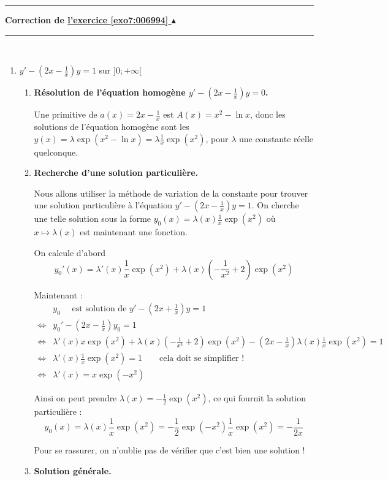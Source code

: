 \documentclass[11pt,a4paper]{article}
\newcounter{exo}
\newcommand{\correction}[1]{\hypertarget{cor7:#1}{}\label{cor7:#1}{\bf Correction de \hyperlink{exo7:#1}{l'exercice \ref{exo7:#1} $\blacktriangle$}}\vspace{1mm}\hrule\vspace{1mm}}
\newcommand{\fincorrection}{\vspace{1mm}\hrule\vspace*{7mm}}
\begin{document}
\fincorrection
\correction{006994}\ 
\begin{enumerate}
  \item $y' - (2x - \frac{1}{x})y = 1$ sur $]0;+\infty[$
  \begin{enumerate}
    \item  \textbf{Résolution de l'équation homogène $y' - (2x - \frac{1}{x})y = 0$.}
    
    Une primitive de $a(x) = 2x - \frac1x$ est $A(x) = x^2 - \ln x$,
    donc les solutions de l'équation homogène sont les $y(x) = \lambda \exp(x^2 - \ln x) = \lambda \frac1x\exp(x^2)$,
    pour $\lambda$ une constante réelle quelconque.
    
    
    \item \textbf{Recherche d'une solution particulière.}
    
    Nous allons utiliser la méthode de variation de la constante pour trouver une solution particulière 
    à l'équation $y' - (2x - \frac{1}{x})y = 1$.
    On cherche une telle solution sous la forme $y_0(x) = \lambda(x) \frac1x\exp(x^2)$ 
    où $x \mapsto \lambda(x)$ est maintenant une fonction.
    
    On calcule d'abord 
    $$y_0'(x) = \lambda'(x) \frac1x\exp(x^2) + \lambda(x) \left(-\frac{1}{x^2}+2\right) \exp(x^2)$$
    
    Maintenant :
    \begin{align*}
          & y_0 \quad \text{ est  solution de }  y' - (2x + \frac{1}{x})y = 1 \\
    \iff & y_0' - (2x - \frac{1}{x})y_0 = 1 \\
    \iff& \lambda'(x) x\exp(x^2) + \lambda(x) \left(-\frac{1}{x^2}+2\right) \exp(x^2)
        - (2x - \frac{1}{x})\lambda(x) \frac1x\exp(x^2) = 1 \\
    \iff& \lambda'(x) \frac1x\exp(x^2) = 1 \qquad \text{cela doit se simplifier !}\\
    \iff& \lambda'(x) = x\exp(-x^2)
    \end{align*}
    
    Ainsi on peut prendre $\lambda(x) = -\frac12\exp(x^2)$, ce qui fournit la solution particulière :
    $$y_0(x) = \lambda(x) \frac1x\exp(x^2) = -\frac12\exp(-x^2)\frac1x\exp(x^2) = -\frac1{2x}$$
    
    Pour se rassurer, on n'oublie pas de vérifier que c'est bien une solution !
    
    \item \textbf{Solution générale.}    
    

\end{enumerate}
\end{enumerate}
\end{document}
